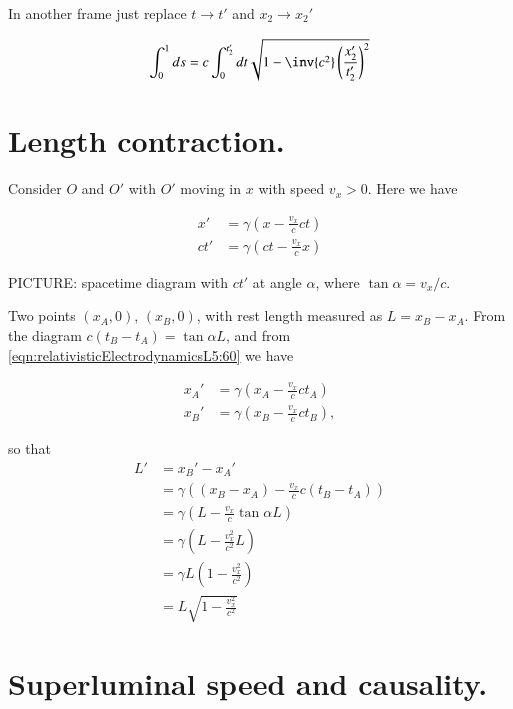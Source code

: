 In another frame just replace $t \rightarrow t'$ and $x_2 \rightarrow x_2'$

\begin{equation}\label{eqn:relativisticElectrodynamicsL5:50}
\int_0^1 ds 
= c \int_0^{t_2'} dt \sqrt{1 - \inv{c^2} \left(\frac{x_2'}{t_2'}\right)^2 } \\
\end{equation}

\section{Length contraction.}

Consider $O$ and $O'$ with $O'$ moving in $x$ with speed $v_x > 0$.  Here we have

\begin{align}\label{eqn:relativisticElectrodynamicsL5:60}
x' &= \gamma \left( x - \frac{v_x}{c} ct \right) \\
c t' &= \gamma \left( ct - \frac{v_x}{c} x \right) 
\end{align}

PICTURE: spacetime diagram with $ct'$ at angle $\alpha$, where $\tan \alpha = v_x/c$.

Two points $(x_A,0)$, $(x_B,0)$, with rest length measured as $L = x_B - x_A$.  From the diagram $c(t_B - t_A) = \tan\alpha L$, and from \ref{eqn:relativisticElectrodynamicsL5:60} we have

\begin{align}\label{eqn:relativisticElectrodynamicsL5:70}
x_A' &= \gamma \left( x_A - \frac{v_x}{c} c t_A \right) \\
x_B' &= \gamma \left( x_B - \frac{v_x}{c} c t_B \right),
\end{align}

so that 
\begin{align*}
L' &= x_B' - x_A' \\
&= \gamma \left( (x_B - x_A) - \frac{v_x}{c} c (t_B -t_A) \right) \\
&= \gamma \left( L - \frac{v_x}{c} \tan \alpha L \right) \\
&= \gamma \left( L - \frac{v_x^2}{c^2} L \right) \\
&= \gamma L \left( 1 - \frac{v_x^2}{c^2} \right) \\
&= L \sqrt{ 1 - \frac{v_x^2}{c^2} } 
\end{align*}

\section{Superluminal speed and causality.}

